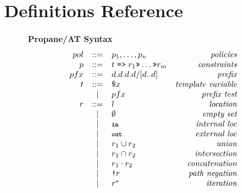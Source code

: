 \documentclass[twocolumn, openany]{sig-alternate-10pt}
\newcommand{\KW}[1]{\texttt{\small\bfseries{#1}}}
\newcommand{\Prefer}{\texttt{>>}}
\newcommand{\Path}{\texttt{=>}}
\newcommand{\In}{\KW{in}}
\newcommand{\Out}{\KW{out}}
\newcommand{\NOT}{\texttt{!}}
\newcommand{\BNFALT}{\;\;|\;\;}
\newcommand{\hdr}[2]{\flushleft \chdr{\hspace{5mm}#1}{#2}}
\newcommand{\chdr}[2]{\textbf{#1} {#2} \\ \centering}%
\begin{document}
\setlength{\pdfpageheight}{\paperheight}
\setlength{\pdfpagewidth}{\paperwidth}

\onecolumn

\appendix

\vspace{2em}
\section{Definitions Reference}

\begin{figure*}[h!]\small
  \begin{minipage}[t]{.45\linewidth}
  \hdr{Propane/AT Syntax}{}
  \vspace*{-1\baselineskip}
  \[ \begin{array}{rclr}
     pol     &::=& p_1, \dots, p_n & \textit{policies} \\
     p       &::=& t \hspace{.3em} \Path \hspace{.3em} r_1 \Prefer \dots \Prefer r_m & \textit{constraints} \\
     pfx     &::=& d.d.d.d/[d..d] & \textit{prefix} \\
     t       &::=& \$x & \textit{template variable} \\
         &\BNFALT& pfx & \textit{prefix test} \\
     r       &::=& l & \textit{location} \\
         &\BNFALT& \emptyset & \textit{empty set} \\
         &\BNFALT& \In & \textit{internal loc} \\
         &\BNFALT& \Out & \textit{external loc} \\
         &\BNFALT& r_1 \cup r_2 & \textit{union} \\
         &\BNFALT& r_1 \cap r_2 & \textit{intersection} \\
         &\BNFALT& r_1 \cdot r_2 & \textit{concatenation} \\
         &\BNFALT& \NOT r & \textit{path negation} \\
         &\BNFALT& r^* & \textit{iteration} \\
  \end{array} \]%


\end{minipage}
\end{figure*}
\end{document}
